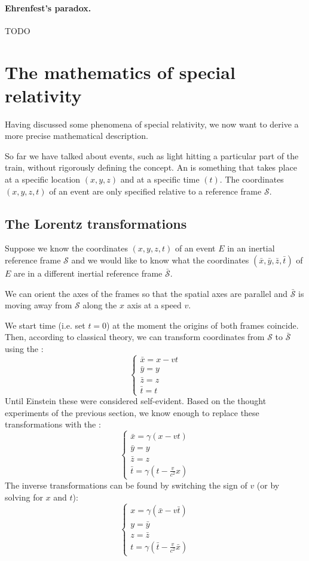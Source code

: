 \subsubsection{Ehrenfest's paradox.} TODO

\chapter{The mathematics of special relativity}
Having discussed some phenomena of special relativity, we now want to derive a more precise mathematical description.

So far we have talked about events, such as light hitting a particular part of the train, without rigorously defining the concept. An  is something that takes place at a specific location $(x,y,z)$ and at a specific time $(t)$. The coordinates $(x,y,z,t)$ of an event are only specified relative to a reference frame $\mathcal{S}$.
\section{The Lorentz transformations}
Suppose we know the coordinates $(x,y,z,t)$ of an event $E$ in an inertial reference frame $\mathcal{S}$ and we would like to know what the coordinates $(\bar{x}, \bar{y}, \bar{z}, \bar{t})$ of $E$ are in a different inertial reference frame $\bar{\mathcal{S}}$.

We can orient the axes of the frames so that the spatial axes are parallel and $\bar{\mathcal{S}}$ is moving away from $\mathcal{S}$ along the $x$ axis at a speed $v$.

We start time (i.e. set $t=0$) at the moment the origins of both frames coincide. Then, according to classical theory, we can transform coordinates from $\mathcal{S}$ to $\bar{\mathcal{S}}$ using the :
\[ \begin{cases}
\bar{x} = x - vt \\
\bar{y} = y \\
\bar{z} = z \\
\bar{t}= t
\end{cases} \]
Until Einstein these were considered self-evident. Based on the thought experiments of the previous section, we know enough to replace these transformations with the :
\[ \begin{cases}
\bar{x} = \gamma(x - vt) \\
\bar{y} = y \\
\bar{z} = z \\
\bar{t}= \gamma\left(t- \frac{v}{c^2}x\right)
\end{cases} \]
The inverse transformations can be found by switching the sign of $v$ (or by solving for $x$ and $t$):
\[ \begin{cases}
x = \gamma(\bar{x} - v\bar{t}) \\
y = \bar{y} \\
z = \bar{z} \\
t= \gamma\left(\bar{t}- \frac{v}{c^2}\bar{x}\right)
\end{cases} \]


